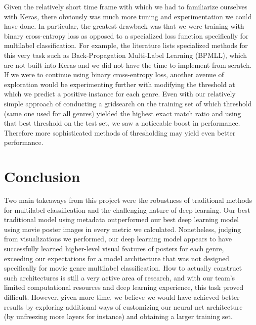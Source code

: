 \documentclass{article}
\begin{document}
    Given the relatively short time frame with which we had to familiarize ourselves with Keras, there obviously was much more tuning and experimentation we could have done. In particular, the greatest drawback was that we were training with binary cross-entropy loss as opposed to a specialized loss function specifically for multilabel classification. For example, the literature lists specialized methods for this very task such as Back-Propagation Multi-Label Learning (BPMLL), which are not built into Keras and we did not have the time to implement from scratch. If we were to continue using binary cross-entropy loss, another avenue of exploration would be experimenting further with modifying the threshold at which we predict a positive instance for each genre. Even with our relatively simple approach of conducting a gridsearch on the training set of which threshold (same one used for all genres) yielded the highest exact match ratio and using that best threshold on the test set, we saw a noticeable boost in performance. Therefore more sophisticated methods of thresholding may yield even better performance.

\section{Conclusion}
    \indent
    
    Two main takeaways from this project were the robustness of traditional methods for multilabel classification and the challenging nature of deep learning. Our best traditional model using metadata outperformed our best deep learning model using movie poster images in every metric we calculated. Nonetheless, judging from visualizations we performed, our deep learning model appears to have successfully learned higher-level visual features of posters for each genre, exceeding our expectations for a model architecture that was not designed specifically for movie genre multilabel classification. How to actually construct such architectures is still a very active area of research, and with our team's limited computational resources and deep learning experience, this task proved difficult. However, given more time, we believe we would have achieved better results by exploring additional ways of customizing our neural net architecture (by unfreezing more layers for instance) and obtaining a larger training set.  
\end{document}

